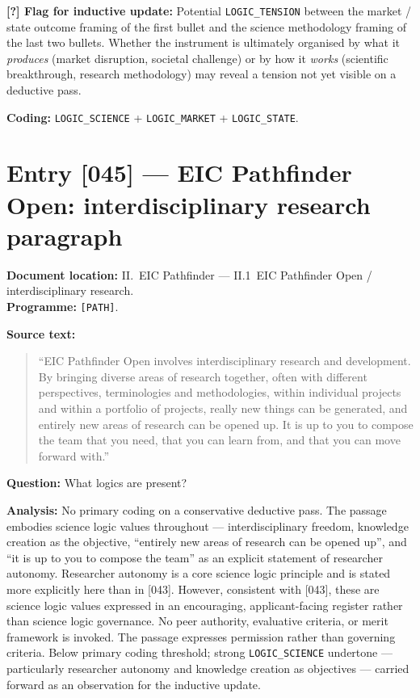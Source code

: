 \textbf{[?] Flag for inductive update:} Potential
\texttt{LOGIC\_TENSION} between the market / state outcome framing of
the first bullet and the science methodology framing of the last two
bullets. Whether the instrument is ultimately organised by what it
\emph{produces} (market disruption, societal challenge) or by how it
\emph{works} (scientific breakthrough, research methodology) may
reveal a tension not yet visible on a deductive pass.

\textbf{Coding:} \texttt{LOGIC\_SCIENCE} + \texttt{LOGIC\_MARKET} +
\texttt{LOGIC\_STATE}.

\section*{Entry [045] --- EIC Pathfinder Open: interdisciplinary research paragraph}

\textbf{Document location:} II.~EIC Pathfinder --- II.1~EIC Pathfinder
Open / interdisciplinary research. \\
\textbf{Programme:} \texttt{[PATH]}.

\textbf{Source text:}
\begin{quote}
\enquote{EIC Pathfinder Open involves interdisciplinary research and
development. By bringing diverse areas of research together, often
with different perspectives, terminologies and methodologies, within
individual projects and within a portfolio of projects, really new
things can be generated, and entirely new areas of research can be
opened up. It is up to you to compose the team that you need, that you
can learn from, and that you can move forward with.}
\end{quote}

\textbf{Question:} What logics are present?

\textbf{Analysis:} No primary coding on a conservative deductive pass.
The passage embodies science logic values throughout ---
interdisciplinary freedom, knowledge creation as the objective,
\enquote{entirely new areas of research can be opened up}, and
\enquote{it is up to you to compose the team} as an explicit statement
of researcher autonomy. Researcher autonomy is a core science logic
principle and is stated more explicitly here than in [043]. However,
consistent with [043], these are science logic values expressed in an
encouraging, applicant-facing register rather than science logic
governance. No peer authority, evaluative criteria, or merit framework
is invoked. The passage expresses permission rather than governing
criteria. Below primary coding threshold; strong \texttt{LOGIC\_SCIENCE}
undertone --- particularly researcher autonomy and knowledge creation
as objectives --- carried forward as an observation for the inductive
update.

